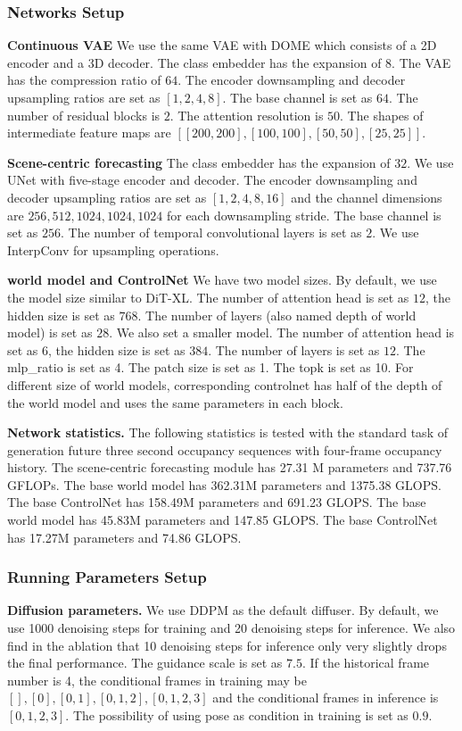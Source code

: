 \subsubsection{Networks Setup}
\textbf{Continuous VAE}
We use the same VAE with DOME\cite{dome} which consists of a 2D encoder and a 3D decoder. The class embedder has the expansion of $8$. The VAE has the compression ratio of $64$. The encoder downsampling and decoder upsampling ratios are set as $[1,2,4,8]$. The base channel is set as $64$. The number of residual blocks is $2$. The attention resolution is $50$. The shapes of intermediate feature maps are $[[200, 200], [100, 100], [50, 50], [25, 25]]$.



\textbf{Scene-centric forecasting}
The class embedder has the expansion of $32$.
We use UNet with five-stage encoder and decoder. The encoder downsampling and decoder upsampling ratios are set as $[1,2,4,8,16]$ and the channel dimensions are $256,512,1024,1024,1024$ for each downsampling stride. The base channel is set as $256$. The number of temporal convolutional layers is set as $2$. We use InterpConv for upsampling operations.

\textbf{\mtd{} world model and ControlNet} We have two model sizes. By default, we use the model size similar to DiT-XL. The number of attention head is set as $12$, the hidden size is set as $768$. The number of layers (also named depth of world model) is set as $28$. We also set a smaller model. The number of attention head is set as $6$, the hidden size is set as $384$. The number of layers is set as $12$. The mlp\_ratio is set as 4. The patch size is set as 1. The topk is set as 10. For different size of world models, corresponding controlnet has half of the depth of the world model and uses the same parameters in each block. 

\textbf{Network statistics.} The following statistics is tested with the standard task of generation future three second occupancy sequences with four-frame occupancy history. The scene-centric forecasting module has 27.31 M parameters and 737.76 GFLOPs. The base world model has 362.31M parameters and 1375.38 GLOPS. The base ControlNet has 158.49M parameters and 691.23 GLOPS. The base world model has 45.83M parameters and 147.85 GLOPS. The base ControlNet has 17.27M parameters and 74.86 GLOPS. 


\subsubsection{Running Parameters Setup}
\textbf{Diffusion parameters.} We use DDPM\cite{ddpm} as the default diffuser. By default, we use 1000 denoising steps for training and 20 denoising steps for inference. We also find in the ablation that 10 denoising steps for inference only very slightly drops the final performance. The guidance scale is set as $7.5$. If the historical frame number is 4, the conditional frames in training may be $[],[0],[0,1],[0,1,2],[0,1,2,3]$ and the conditional frames in inference is $[0,1,2,3]$. The possibility of using pose as condition in training is set as $0.9$.


